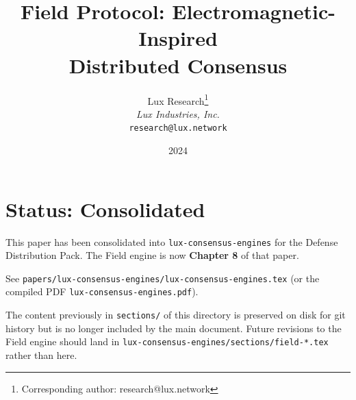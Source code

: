 \documentclass[11pt,a4paper]{article}
\title{\textbf{Field Protocol: Electromagnetic-Inspired\\Distributed Consensus}}
\author{
Lux Research\thanks{Corresponding author: research@lux.network}\\
\textit{Lux Industries, Inc.}\\
\texttt{research@lux.network}
}
\date{2024}
\begin{document}
\luxcoverpage

\section*{Status: Consolidated}

This paper has been consolidated into \texttt{lux-consensus-engines} for the
Defense Distribution Pack. The Field engine is now \textbf{Chapter 8} of that paper.

See \texttt{papers/lux-consensus-engines/lux-consensus-engines.tex} (or the
compiled PDF \texttt{lux-consensus-engines.pdf}).

The content previously in \texttt{sections/} of this directory is preserved on
disk for git history but is no longer included by the main document. Future
revisions to the Field engine should land in
\texttt{lux-consensus-engines/sections/field-*.tex} rather than here.
\end{document}
